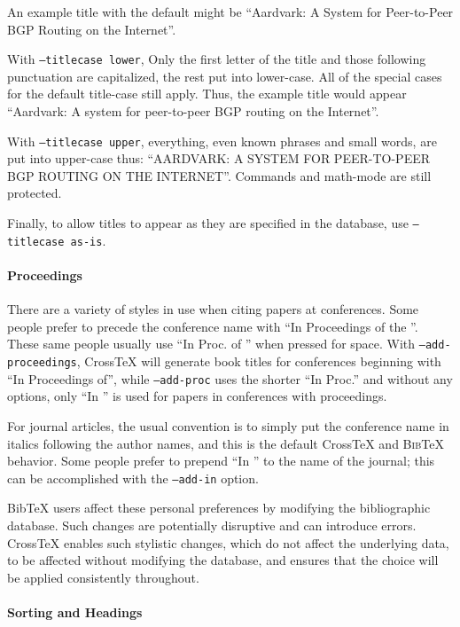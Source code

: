 \documentclass{article}
\newcommand{\XTeX}{Cross\TeX}
\newcommand{\BibTeX}{\textsc{Bib}\TeX}
\begin{document}
An example title with the default might be ``Aardvark: A System for Peer-to-Peer BGP Routing on the Internet''.

With \texttt{--titlecase lower}, Only the first letter of the title and those following punctuation are capitalized, the rest put into lower-case.  All of the special cases for the default title-case still apply.  Thus, the example title would appear ``Aardvark: A system for peer-to-peer BGP routing on the Internet''.

With \texttt{--titlecase upper}, everything, even known phrases and small words, are put into upper-case thus: ``AARDVARK: A SYSTEM FOR PEER-TO-PEER BGP ROUTING ON THE INTERNET''.  Commands and math-mode are still protected.

Finally, to allow titles to appear as they are specified in the database, use \texttt{--titlecase as-is}.

\paragraph{Proceedings}

There are a variety of styles in use when citing papers at conferences. Some
people prefer to precede the conference name with ``In Proceedings of the ''. 
These same people usually use ``In Proc. of '' when pressed for space.
With \texttt{--add-proceedings}, \XTeX{}
will generate book titles for conferences beginning with ``In
Proceedings of'', while \texttt{--add-proc} uses the shorter ``In
Proc.'' and without any options, only ``In '' is used for papers
in conferences with proceedings. 

For journal articles, the usual convention is to simply put the 
conference name in italics following the author names, and this is
the default \XTeX{} and \BibTeX{} behavior. Some people prefer to prepend
``In '' to the name of the journal; this can be accomplished with the 
\texttt{--add-in} option.

BibTeX users affect these personal preferences by modifying the bibliographic
database. Such changes are potentially disruptive and can introduce errors. 
\XTeX{} enables such stylistic changes, which do not affect the underlying data, 
to be affected without modifying the database, and ensures that the choice will
be applied consistently throughout.

\paragraph{Sorting and Headings}
\end{document}
